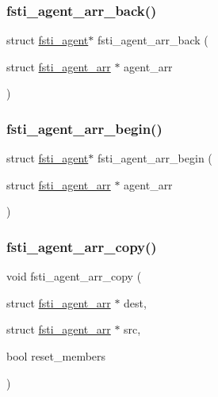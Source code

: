 \mbox{\label{fsti-agent_8h_a88eb4bd7a7df9dcbc5b57d3e3e22f9c6}} 
\subsubsection{\texorpdfstring{fsti\+\_\+agent\+\_\+arr\+\_\+back()}{fsti\_agent\_arr\_back()}}
{\footnotesize\ttfamily struct \mbox{\hyperlink{structfsti__agent}{fsti\+\_\+agent}}$\ast$ fsti\+\_\+agent\+\_\+arr\+\_\+back (\begin{DoxyParamCaption}\item[{struct \mbox{\hyperlink{structfsti__agent__arr}{fsti\+\_\+agent\+\_\+arr}} $\ast$}]{agent\+\_\+arr }\end{DoxyParamCaption})}

\mbox{\label{fsti-agent_8h_a30c755dbd7cd8e98b76ebe65b8dc54a2}} 
\subsubsection{\texorpdfstring{fsti\+\_\+agent\+\_\+arr\+\_\+begin()}{fsti\_agent\_arr\_begin()}}
{\footnotesize\ttfamily struct \mbox{\hyperlink{structfsti__agent}{fsti\+\_\+agent}}$\ast$ fsti\+\_\+agent\+\_\+arr\+\_\+begin (\begin{DoxyParamCaption}\item[{struct \mbox{\hyperlink{structfsti__agent__arr}{fsti\+\_\+agent\+\_\+arr}} $\ast$}]{agent\+\_\+arr }\end{DoxyParamCaption})}

\mbox{\label{fsti-agent_8h_ae9ffb7f208aa2ca7f0e5a1999ae69425}} 
\subsubsection{\texorpdfstring{fsti\+\_\+agent\+\_\+arr\+\_\+copy()}{fsti\_agent\_arr\_copy()}}
{\footnotesize\ttfamily void fsti\+\_\+agent\+\_\+arr\+\_\+copy (\begin{DoxyParamCaption}\item[{struct \mbox{\hyperlink{structfsti__agent__arr}{fsti\+\_\+agent\+\_\+arr}} $\ast$}]{dest,  }\item[{struct \mbox{\hyperlink{structfsti__agent__arr}{fsti\+\_\+agent\+\_\+arr}} $\ast$}]{src,  }\item[{bool}]{reset\+\_\+members }\end{DoxyParamCaption})}

